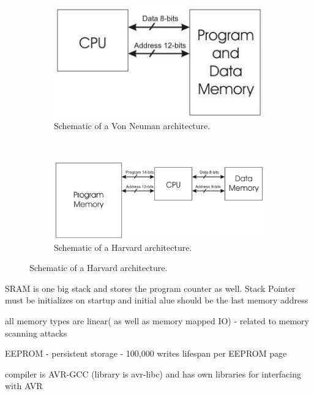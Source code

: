\documentclass[12pt,a4paper,twocolumn]{article}
\begin{document}
\begin{figure}
	\begin{subfigure}[b]{0.3\textwidth}
		\includegraphics[scale=0.65]{img/von_neuman_arch.jpg}
		\caption{Schematic of a Von Neuman architecture.}
		\label{fig:VN_arch}
	\end{subfigure} \\
	
	\begin{subfigure}[b]{0.3\textwidth}
		\includegraphics[scale=0.5]{img/harvard_arch.jpeg}
		\caption{Schematic of a Harvard architecture.}
		\label{fig:H_arch}
	\end{subfigure}
\end{figure}	
	
	SRAM is one big stack and stores the program counter as well. Stack Pointer must be initializes on startup and initial alue should be the last memory address
	
	all memory types are linear( as well as memory mapped IO) - related to memory scanning attacks
	
	EEPROM - persistent storage - 100,000 writes lifespan per EEPROM page
	
	compiler is AVR-GCC (library is avr-libc) and has own libraries for interfacing with AVR
	
\end{document}
